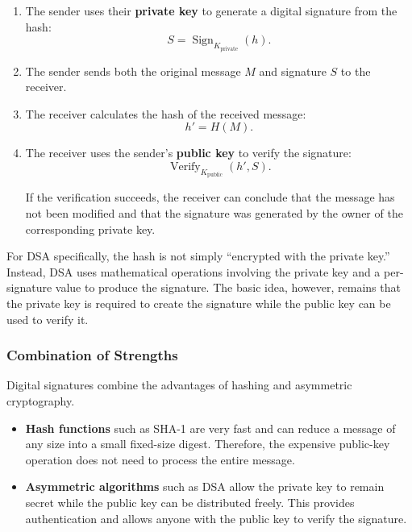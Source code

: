 \documentclass[a4paper, 10pt]{article}
\begin{document}
\begin{problem}
\begin{subproblems_alpha}
\begin{solution}
\begin{enumerate}
			      \item The sender uses their \textbf{private key} to generate a digital signature from the hash:
			            \[
				            S = \operatorname{Sign}_{K_{\mathrm{private}}}(h).
			            \]

			      \item The sender sends both the original message $M$ and signature $S$ to the receiver.

			      \item The receiver calculates the hash of the received message:
			            \[
				            h' = H(M).
			            \]

			      \item The receiver uses the sender's \textbf{public key} to verify the signature:
			            \[
				            \operatorname{Verify}_{K_{\mathrm{public}}}(h',S).
			            \]

			            If the verification succeeds,
			            the receiver can conclude that the message has not been modified
			            and that the signature was generated by the owner of the corresponding private key.
		      \end{enumerate}

		      For DSA specifically, the hash is not simply ``encrypted with the private key.''
		      Instead, DSA uses mathematical operations involving the private key
		      and a per-signature value to produce the signature.
		      The basic idea, however, remains that the private key is required to create the signature
		      while the public key can be used to verify it.

		      \subsubsection*{Combination of Strengths}

		      Digital signatures combine the advantages of hashing and asymmetric cryptography.

		      \begin{itemize}
			      \item \textbf{Hash functions} such as SHA-1 are very fast
			            and can reduce a message of any size into a small fixed-size digest.
			            Therefore, the expensive public-key operation does not need to process the entire message.

			      \item \textbf{Asymmetric algorithms} such as DSA allow the private key
			            to remain secret while the public key can be distributed freely.
			            This provides authentication and allows anyone with the public key to verify the signature.
		      \end{itemize}


\end{solution}
\end{subproblems_alpha}
\end{problem}
\end{document}
